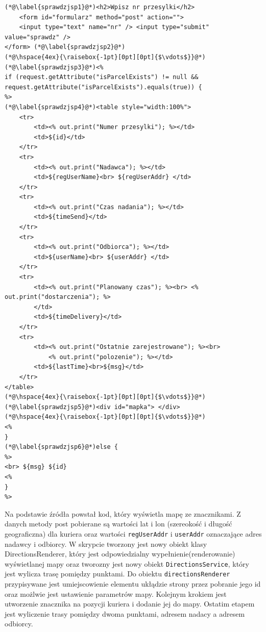 \documentclass[eng,printmode,oneside]{mgr}
\begin{document}
\begin{lstlisting}[caption=Ciało pliku JavaServlet Pages -
sprawdz.jsp,label=sprawdzjsp] 
(*@\label{sprawdzjsp1}@*)<h2>Wpisz nr przesylki</h2> 
	<form id="formularz" method="post" action=""> 
	<input type="text" name="nr" /> <input type="submit" value="sprawdz" />
</form> (*@\label{sprawdzjsp2}@*)
(*@\hspace{4ex}{\raisebox{-1pt}[0pt][0pt]{$\vdots$}}@*)
(*@\label{sprawdzjsp3}@*)<%
if (request.getAttribute("isParcelExists") != null &&
request.getAttribute("isParcelExists").equals(true)) {
%>
(*@\label{sprawdzjsp4}@*)<table style="width:100%">
	<tr>
		<td><% out.print("Numer przesylki"); %></td>
		<td>${id}</td>
	</tr>
	<tr>
		<td><% out.print("Nadawca"); %></td>
		<td>${regUserName}<br> ${regUserAddr} </td>
	</tr>
	<tr>
		<td><% out.print("Czas nadania"); %></td>
		<td>${timeSend}</td>
	</tr>
	<tr>
		<td><% out.print("Odbiorca"); %></td>
		<td>${userName}<br> ${userAddr} </td>
	</tr>
	<tr>
		<td><% out.print("Planowany czas"); %><br> <% out.print("dostarczenia"); %>
		</td>
		<td>${timeDelivery}</td>
	</tr>
	<tr>
		<td><% out.print("Ostatnie zarejestrowane"); %><br>
			<% out.print("polozenie"); %></td>
		<td>${lastTime}<br>${msg}</td>
	</tr>
</table>
(*@\hspace{4ex}{\raisebox{-1pt}[0pt][0pt]{$\vdots$}}@*)
(*@\label{sprawdzjsp5}@*)<div id="mapka"> </div>
(*@\hspace{4ex}{\raisebox{-1pt}[0pt][0pt]{$\vdots$}}@*)
<%
}
(*@\label{sprawdzjsp6}@*)else {
%>
<br> ${msg} ${id}
<% 
}
%>
\end{lstlisting}

Na podstawie źródła \cite{developer.google.maps} powstał kod, który wyświetla
mapę ze znacznikami. Z danych metody post pobierane są wartości lat i lon
(szereokość i długość geograficzna) dla kuriera oraz wartości
\texttt{regUserAddr} i \texttt{userAddr} oznaczające adres nadawcy i odbiorcy. W
skrypcie tworzony jest nowy obiekt klasy DirectionsRenderer, który jest odpowiedzialny
wypełnienie(renderowanie) wyświetlanej mapy oraz tworozny jest nowy obiekt
\texttt{DirectionsService}, który jest wylicza trasę pomiędzy punktami.
Do obiektu \texttt{directionsRenderer} przypisywane jest umiejscowienie elementu
ukłądzie strony przez pobranie jego id oraz możlwie jest ustawienie parametrów mapy.
Kolejnym krokiem jest utworzenie znacznika na pozycji kuriera i dodanie jej do
mapy. Ostatim etapem jest wyliczenie trasy pomiędzy dwoma punktami, adresem
nadacy a adresem odbiorcy.
\end{document}
